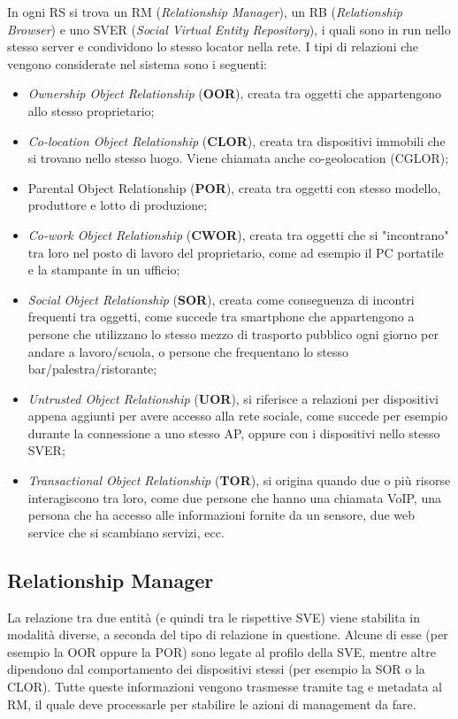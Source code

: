 In ogni RS si trova un RM (\textit{Relationship Manager}), un RB (\textit{Relationship Browser}) e uno SVER (\textit{Social Virtual Entity Repository}), i quali sono in run nello stesso server e condividono lo stesso locator nella rete.
I tipi di relazioni che vengono considerate nel sistema sono i seguenti:
\begin{itemize}
    \item \textit{Ownership Object Relationship} (\textbf{OOR}), creata tra oggetti che appartengono allo stesso proprietario;
    \item \textit{Co-location Object Relationship} (\textbf{CLOR}), creata tra dispositivi immobili che si trovano nello stesso luogo. Viene chiamata anche co-geolocation (CGLOR);
    \item Parental Object Relationship (\textbf{POR}), creata tra oggetti con stesso modello, produttore e lotto di produzione;
    \item \textit{Co-work Object Relationship} (\textbf{CWOR}), creata tra oggetti che si "incontrano" tra loro nel posto di lavoro del proprietario, come ad esempio il PC portatile e la stampante in un ufficio;
    \item \textit{Social Object Relationship} (\textbf{SOR}), creata come conseguenza di incontri frequenti tra oggetti, come succede tra smartphone che appartengono a persone che utilizzano lo stesso mezzo di trasporto pubblico ogni giorno per andare a lavoro/scuola, o persone che frequentano lo stesso bar/palestra/ristorante;
    \item \textit{Untrusted Object Relationship} (\textbf{UOR}), si riferisce a relazioni per dispositivi appena aggiunti per avere accesso alla rete sociale, come succede per esempio durante la connessione a uno stesso AP, oppure con i dispositivi nello stesso SVER;
    \item \textit{Transactional Object Relationship} (\textbf{TOR}), si origina quando due o più risorse interagiscono tra loro, come due persone che hanno una chiamata VoIP, una persona che ha accesso alle informazioni fornite da un sensore, due web service che si scambiano servizi, ecc.
\end{itemize}

\subsection{Relationship Manager}
\label{c:grids:rm}

La relazione tra due entità (e quindi tra le rispettive SVE) viene stabilita in modalità diverse, a seconda del tipo di relazione in questione. Alcune di esse (per esempio la OOR oppure la POR) sono legate al profilo della SVE, mentre altre dipendono dal comportamento dei dispositivi stessi (per esempio la SOR o la CLOR). Tutte queste informazioni vengono trasmesse tramite tag e metadata al RM, il quale deve processarle per stabilire le azioni di management da fare. 

